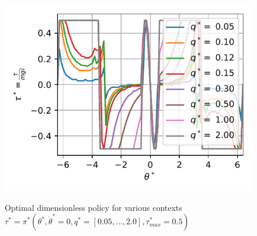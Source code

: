 \begin{figure}[ht]
\begin{center}
\includegraphics[width=0.99\linewidth]{fig/s_q_5_2.pdf}
\caption{Optimal dimensionless policy for various contexts  $\tau^* = \pi^*( \theta^*  , \dot{\theta}^* = 0 , q^* = [0.05, ... , 2.0]  , \tau^*_{max} = 0.5 )$}
\vspace{-10pt}
\label{fig:q_sensitivity}
\end{center}
\end{figure}

